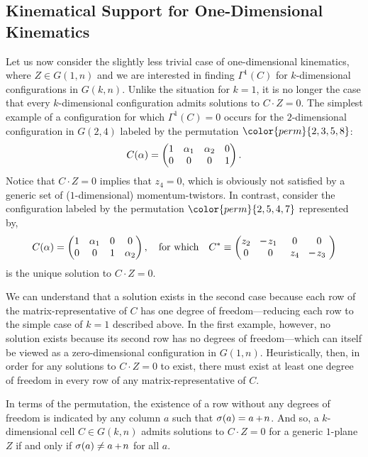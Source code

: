 \documentclass[12pt,hyperref,compress]{JHEP3}
\newcommand{\eq}[1]{\begin{equation}#1\end{equation}}
\newcommand{\mi}{{\rm\rule[2.4pt]{6pt}{0.65pt}}}
\newcommand{\pl}{\hspace{0.5pt}\text{{\small+}}\hspace{-0.5pt}}
\begin{document}
{\subsection{Kinematical Support for One-Dimensional Kinematics}
Let us now consider the slightly less trivial case of one-dimensional kinematics, where $Z\!\in\!G(1,n)$ and we are interested in finding $\Gamma^1(C)$ for $k$-dimensional configurations in $G(k,n)$. Unlike the situation for $k=1$, it is no longer the case that every $k$-dimensional configuration admits solutions to $C\!\cdot\!Z=0$. The simplest example of a configuration for which $\Gamma^1(C)=0$ occurs for the $2$-dimensional configuration in $G(2,4)$ labeled by the permutation ${\color{perm}\{2,3,5,8\}}$: \vspace{-.2cm}\eq{C(\alpha)=\left(\begin{array}{@{}cccc@{}}1&\alpha_1&\alpha_2&0\\0&0&0&1\end{array}\right).\vspace{-.2cm}}
Notice that $C\!\cdot\!Z=0$ implies that $z_4=0$, which is obviously not satisfied by a generic set of ($1$-dimensional) momentum-twistors. In contrast, consider the configuration labeled by the permutation ${\color{perm}\{2,5,4,7\}}$ represented by,
\vspace{-.2cm}\eq{C(\alpha)=\left(\begin{array}{@{}cccc@{}}1&\alpha_1&0&0\\0&0&1&\alpha_2\end{array}\right),\quad\text{for which}\quad C^*\equiv\left(\begin{array}{@{}cccc@{}}z_2&\mi\,z_1\,\,&0&0\\0&0&z_4&\mi\,z_3\,\,\end{array}\right)\vspace{-.3cm}}
is the unique solution to $C\!\cdot\!Z=0$.

We can understand that a solution exists in the second case because each row of the matrix-representative of $C$ has one degree of freedom---reducing each row to the simple case of $k=1$ described above. In the first example, however, no solution exists because its second row has no degrees of freedom---which can itself be viewed as a zero-dimensional configuration in $G(1,n)$. Heuristically, then, in order for any solutions to $C\!\cdot\!Z=0$ to exist, there must exist at least one degree of freedom in every row of any matrix-representative of $C$.

In terms of the permutation, the existence of a row without any degrees of freedom is indicated by any column $a$ such that $\sigma(a)=a\,\pl\,n$. And so, a $k$-dimensional cell $C\!\in\!G(k,n)$ admits solutions to $C\!\cdot\!Z=0$ for a generic $1$-plane $Z$ if and only if $\sigma(a)\neq a\,\pl\,n$ for all $a$.


}
\end{document}
